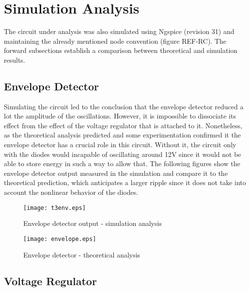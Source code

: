 \section{Simulation Analysis}
\label{sec:simulation}

The circuit under analysis was also simulated using Ngspice (revision 31) and maintaining the already mentioned node convention (figure REF-RC). The forward subsections establish a comparison between theoretical and simulation results.

\subsection{Envelope Detector}

Simulating the circuit led to the conclusion that the envelope detector reduced a lot the amplitude of the oscillations. However, it is impossible to dissociate its effect from the effect of the voltage regulator that is attached to it. Nonetheless, as the theoretical analysis predicted and some experimentation confirmed it the envelope detector has a crucial role in this circuit. Without it, the circuit only with the diodes would incapable of oscillating around 12V since it would not be able to store energy in such a way to allow that. The following figures show the envelope detector output measured in the simulation and compare it to the theoretical prediction, which anticipates a larger ripple since it does not take into account the nonlinear behavior of the diodes. 



\begin{figure}[h] \centering
  \begin{minipage}{.45\textwidth}
    \texttt{[image: t3env.eps]}
    \caption{Envelope detector output - simulation analysis}
    \label{fig:simenv}
  \end{minipage}%
    \hspace{2 mm}
  \begin{minipage}{.45\textwidth}
  \centering
    \texttt{[image: envelope.eps]}
    \caption{Envelope detector - theoretical analysis}
    \label{fig:compenv}
      \end{minipage}%
\end{figure}

\newpage
\subsection{Voltage Regulator}

